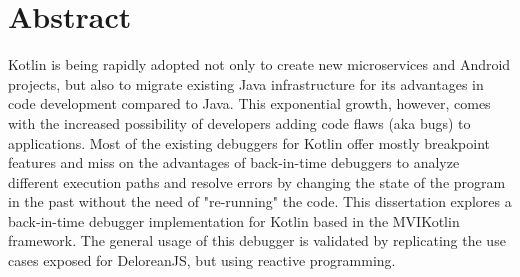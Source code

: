 
\chapter{Abstract}
Kotlin is being rapidly adopted not only to create new microservices and Android projects, but also to migrate existing Java infrastructure for its advantages in code development compared to Java. This exponential growth, however, comes with the increased possibility of developers adding code flaws (aka bugs) to applications. Most of the existing debuggers for Kotlin offer mostly breakpoint features and miss on the advantages of back-in-time debuggers to analyze different execution paths and resolve errors by changing the state of the program in the past without the need of "re-running" the code. This dissertation explores a back-in-time debugger implementation for Kotlin based in the MVIKotlin framework. The general usage of this debugger is validated by replicating the use cases exposed for DeloreanJS, but using reactive programming.
\endinput


